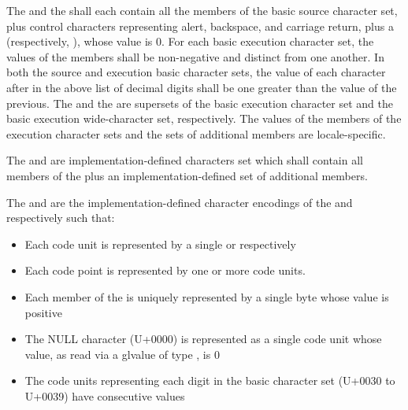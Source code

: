 \documentclass{wg21}
\begin{document}
\pnum
\begin{removedblock}
The  and the
shall each contain all the members of the
basic source character set, plus control characters representing alert,
backspace, and carriage return, plus a 
(respectively, ), whose value is 0.
For each basic execution character set, the values of the
members shall be non-negative and distinct from one another. In both the
source and execution basic character sets, the value of each character
after  in the above list of decimal digits shall be one greater
than the value of the previous. The 
and the  are
supersets of the
basic execution character set and the basic execution wide-character
set, respectively. The values of the members of the execution character sets
and the sets of additional members
are locale-specific.%
\end{removedblock}

\begin{addedblock}

The  and  are implementation-defined characters set which shall contain all members
of the  plus an implementation-defined set of additional members.

The  and  are the implementation-defined character encodings of the  and  respectively such that:

\begin{itemize}
\item Each code unit is represented by a single  or  respectively
\item Each code point is represented by one or more code units.
\item Each member of the  is uniquely represented by a single byte whose value is positive
\item The NULL character (U+0000) is represented as a single code unit whose value, as read via a glvalue of type , is 0
\item The code units representing each digit in the basic character set (U+0030 to U+0039) have consecutive values
\end{itemize}

\end{addedblock}
\end{document}
